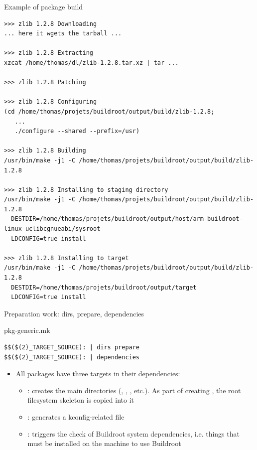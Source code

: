 \begin{frame}[fragile]{Example of package build}

\tiny
\begin{verbatim}
>>> zlib 1.2.8 Downloading
... here it wgets the tarball ...

>>> zlib 1.2.8 Extracting
xzcat /home/thomas/dl/zlib-1.2.8.tar.xz | tar ...

>>> zlib 1.2.8 Patching

>>> zlib 1.2.8 Configuring
(cd /home/thomas/projets/buildroot/output/build/zlib-1.2.8;
   ...
   ./configure --shared --prefix=/usr)

>>> zlib 1.2.8 Building
/usr/bin/make -j1 -C /home/thomas/projets/buildroot/output/build/zlib-1.2.8

>>> zlib 1.2.8 Installing to staging directory
/usr/bin/make -j1 -C /home/thomas/projets/buildroot/output/build/zlib-1.2.8
  DESTDIR=/home/thomas/projets/buildroot/output/host/arm-buildroot-linux-uclibcgnueabi/sysroot
  LDCONFIG=true install

>>> zlib 1.2.8 Installing to target
/usr/bin/make -j1 -C /home/thomas/projets/buildroot/output/build/zlib-1.2.8
  DESTDIR=/home/thomas/projets/buildroot/output/target
  LDCONFIG=true install
\end{verbatim}
\end{frame}

\begin{frame}[fragile]{Preparation work: dirs, prepare, dependencies}

  \begin{block}{pkg-generic.mk}
    \begin{verbatim}
$$($(2)_TARGET_SOURCE): | dirs prepare
$$($(2)_TARGET_SOURCE): | dependencies
    \end{verbatim}
  \end{block}

  \begin{itemize}
  \item All packages have three targets in their dependencies:
    \begin{itemize}
    \item {}: creates the main directories (,
      , , etc.). As part of creating
      , the root filesystem skeleton is copied into
      it
    \item {}: generates a kconfig-related 
      file
    \item {}: triggers the check of Buildroot system
      dependencies, i.e. things that must be installed on the machine
      to use Buildroot
    \end{itemize}
  \end{itemize}
\end{frame}

